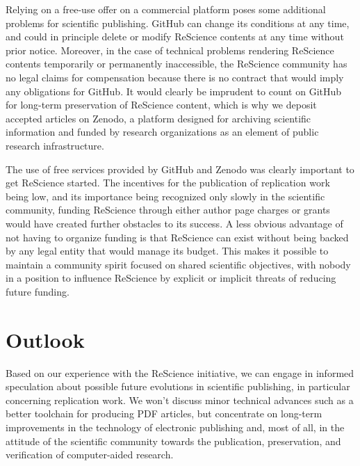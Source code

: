 \documentclass[a4paper,10pt, twocolumn]{article}
\begin{document}
Relying on a free-use offer on a commercial platform poses some
additional problems for scientific publishing. GitHub can change its
conditions at any time, and could in principle delete or modify
ReScience contents at any time without prior notice. Moreover, in the
case of technical problems rendering ReScience contents temporarily or
permanently inaccessible, the ReScience community has no legal claims
for compensation because there is no contract that would imply any
obligations for GitHub. It would clearly be imprudent to count on
GitHub for long-term preservation of ReScience content, which is why
we deposit accepted articles on Zenodo, a platform designed for
archiving scientific information and funded by research organizations
as an element of public research infrastructure.

The use of free services provided by GitHub and Zenodo was clearly
important to get ReScience started. The incentives for the publication
of replication work being low, and its importance being recognized
only slowly in the scientific community, funding ReScience through
either author page charges or grants would have created further
obstacles to its success. A less obvious advantage of not having to
organize funding is that ReScience can exist without being backed by
any legal entity that would manage its budget. This makes it possible
to maintain a community spirit focused on shared scientific
objectives, with nobody in a position to influence ReScience by
explicit or implicit threats of reducing future funding.

\section*{Outlook}

Based on our experience with the ReScience initiative, we can engage
in informed speculation about possible future evolutions in scientific
publishing, in particular concerning replication work. We won't
discuss minor technical advances such as a better toolchain for
producing PDF articles, but concentrate on long-term improvements in
the technology of electronic publishing and, most of all, in the
attitude of the scientific community towards the publication,
preservation, and verification of computer-aided research.

\end{document}
